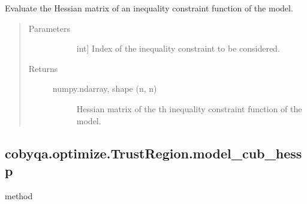 \documentclass[letterpaper,10pt,english]{sphinxmanual}
\begin{document}
\begin{fulllineitems}
\begin{fulllineitems}
\label{\detokenize{refs/generated/cobyqa.optimize.TrustRegion.model_cub_hess:cobyqa.optimize.TrustRegion.model_cub_hess}}
\sphinxAtStartPar
Evaluate the Hessian matrix of an inequality constraint function of the
model.
\begin{quote}\begin{description}
\item[{Parameters}] \leavevmode\begin{description}
\item[{}] \leavevmode{[}int{]}
\sphinxAtStartPar
Index of the inequality constraint to be considered.

\end{description}

\item[{Returns}] \leavevmode\begin{description}
\item[{numpy.ndarray, shape (n, n)}] \leavevmode
\sphinxAtStartPar
Hessian matrix of the \sphinxhyphen{}th inequality constraint function of the
model.

\end{description}

\end{description}\end{quote}

\end{fulllineitems}



\subsection{cobyqa.optimize.TrustRegion.model\_cub\_hessp}
\label{\detokenize{refs/generated/cobyqa.optimize.TrustRegion.model_cub_hessp:cobyqa-optimize-trustregion-model-cub-hessp}}\label{\detokenize{refs/generated/cobyqa.optimize.TrustRegion.model_cub_hessp::doc}}
\sphinxAtStartPar
method


\end{fulllineitems}
\end{document}
